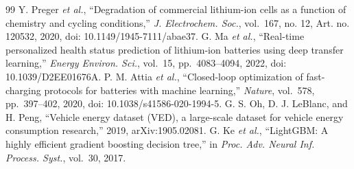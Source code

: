 \documentclass[journal]{IEEEtran}
\begin{document}
\begin{thebibliography}{99}
 Y. Preger \emph{et al.}, ``Degradation of commercial lithium-ion cells as a function of chemistry and cycling conditions,'' \emph{J. Electrochem. Soc.}, vol.~167, no. 12, Art. no. 120532, 2020, doi: 10.1149/1945-7111/abae37.
 G. Ma \emph{et al.}, ``Real-time personalized health status prediction of lithium-ion batteries using deep transfer learning,'' \emph{Energy Environ. Sci.}, vol.~15, pp.~4083--4094, 2022, doi: 10.1039/D2EE01676A.
 P. M. Attia \emph{et al.}, ``Closed-loop optimization of fast-charging protocols for batteries with machine learning,'' \emph{Nature}, vol.~578, pp.~397--402, 2020, doi: 10.1038/s41586-020-1994-5.
 G. S. Oh, D. J. LeBlanc, and H. Peng, ``Vehicle energy dataset (VED), a large-scale dataset for vehicle energy consumption research,'' 2019, arXiv:1905.02081.
 G. Ke \emph{et al.}, ``LightGBM: A highly efficient gradient boosting decision tree,'' in \emph{Proc. Adv. Neural Inf. Process. Syst.}, vol.~30, 2017.
\end{thebibliography}
\end{document}
